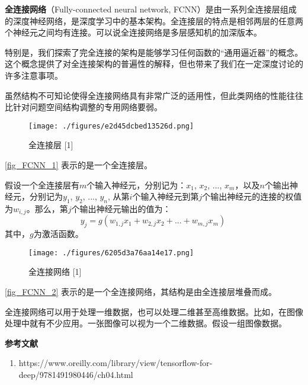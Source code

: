 



\textbf{全连接网络}（Fully-connected neural network, FCNN）是由一系列全连接层组成的深度神经网络，是深度学习中的基本架构。全连接层的特点是相邻两层的任意两个神经元之间均有连接。可以说全连接网络是多层感知机的加深版本。

特别是，我们探索了完全连接的架构是能够学习任何函数的“通用逼近器”的概念。这个概念提供了对全连接架构的普遍性的解释，但也带来了我们在一定深度讨论的许多注意事项。

虽然结构不可知论使得全连接网络具有非常广泛的适用性，但此类网络的性能往往比针对问题空间结构调整的专用网络要弱。

\begin{figure}[ht]
\centering
\texttt{[image: ./figures/e2d45dcbed13526d.png]}
\caption{全连接层 [1]} \label{fig_FCNN_1}
\end{figure}
\autoref{fig_FCNN_1} 表示的是一个全连接层。

假设一个全连接层有$m$个输入神经元，分别记为：$x_1$, $x_2$, ..., $x_m$，以及$n$个输出神经元，分别记为$y_1$, $y_2$, ..., $y_n$, 从第$i$个输入神经元到第$j$个输出神经元的连接的权值为$w_{i,j}$。那么，第$j$个输出神经元输出的值为：
\begin{equation}
y_j=g(w_{1,j}x_1+w_{2,j}x_2+...+w_{m,j}x_m)~
\end{equation}
其中，$g$为激活函数。

\begin{figure}[ht]
\centering
\texttt{[image: ./figures/6205d3a76aa14e17.png]}
\caption{全连接网络 [1]} \label{fig_FCNN_2}
\end{figure}
\autoref{fig_FCNN_2} 表示的是一个全连接网络，其结构是由全连接层堆叠而成。

全连接网络可以用于处理一维数据，也可以处理二维甚至高维数据。比如，在图像处理中就有不少应用。一张图像可以视为一个二维数据。假设一组图像数据。



\textbf{参考文献}
\begin{enumerate}
\item https://www.oreilly.com/library/view/tensorflow-for-deep/9781491980446/ch04.html
\end{enumerate}